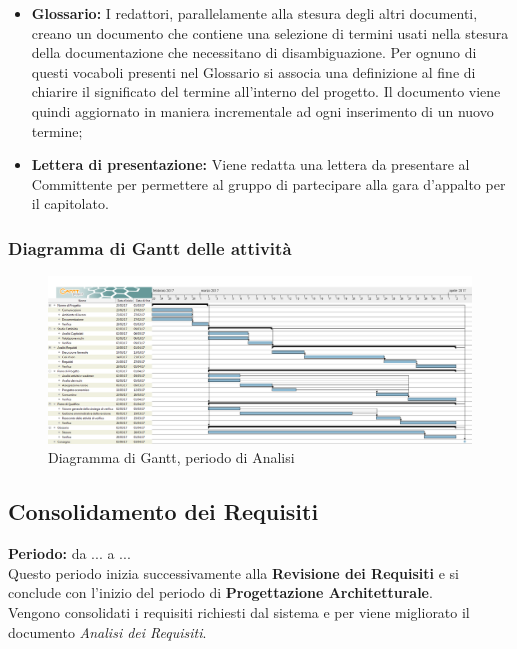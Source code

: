 \begin{itemize}
		\item \textbf{Glossario:} I redattori, parallelamente alla stesura degli altri documenti, creano un documento che contiene una selezione di termini usati nella stesura della documentazione che necessitano di disambiguazione. Per ognuno di questi vocaboli presenti nel Glossario si associa una definizione al fine di chiarire il significato del termine all'interno del progetto. Il documento viene quindi aggiornato in maniera incrementale ad ogni inserimento di un nuovo termine;
		\item \textbf{Lettera di presentazione:} Viene redatta una lettera da presentare al Committente per permettere al gruppo di partecipare alla gara d'appalto per il capitolato. \\
	\end{itemize}
	\subsubsection{Diagramma di Gantt delle attività}
	\begin{figure}[H]
		\centering
		\includegraphics[width=1\linewidth]{immagini/gantt/analisi.png}
		\caption{Diagramma di Gantt, periodo di Analisi}
	\end{figure}
	\subsection{Consolidamento dei Requisiti}
	\textbf{Periodo:} da ... a ... \\
	Questo periodo inizia successivamente alla \textbf{Revisione dei Requisiti} e si conclude con l'inizio del periodo di \textbf{Progettazione Architetturale}. \\
	Vengono consolidati i requisiti richiesti dal sistema e per viene migliorato il documento \textit{Analisi dei Requisiti}. \\
